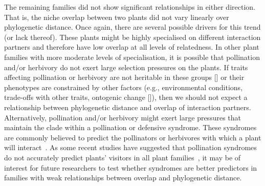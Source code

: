 \documentclass[12pt]{article}
\begin{document}
\begin{spacing}{1.5}
  The remaining families did not show significant relationships 
  in either direction. That is, the niche overlap between two 
  plants did not vary linearly over phylogenetic distance. Once again, there 
  are several possible drivers for this trend (or lack thereof). These plants might 
  be highly specialised on different interaction partners and therefore
  have low overlap at all levels of relatedness. In other plant families
  with more moderate levels of specialisation, it is possible 
  that pollination and/or herbivory do not exert large
  selection pressures on the plants. If traits affecting pollination
  or herbivory are not heritable in these groups [\citealp{Kursar2009}] 
  or their phenotypes are constrained by other factors (e.g., 
  environmental conditions, trade-offs with other traits, ontogenic
  change [\citealp{Karinho2014}]), then we should not expect a relationship 
  between phylogenetic distance and overlap of interaction partners.
  Alternatively, pollination and/or herbivory might exert large 
  pressures that maintain the clade within a pollination or 
  defensive syndrome. These syndromes are commonly believed to
  predict the pollinators or herbivores with which a plant will 
  interact~\citep{Waser1996,Fenster2004,Ollerton2009,Johnson2014}.
  As some recent studies have suggested that pollination syndromes
  do not accurately predict plants' visitors in all plant 
  families~\citep{Ollerton2009},
  it may be of interest for future researchers to test whether 
  syndromes are better predictors in families with weak 
  relationships between overlap and phylogenetic distance.



\end{spacing}
\end{document}
